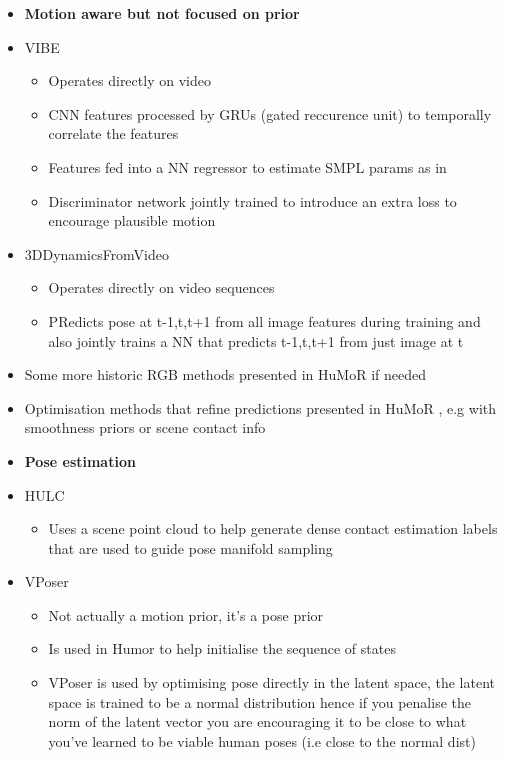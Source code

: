 \begin{itemize}
    \item \textbf{Motion aware but not focused on prior}
    \item VIBE
    \begin{itemize}
        \item Operates directly on video
        \item CNN features processed by GRUs (gated reccurence unit) to temporally correlate the features
        \item Features fed into a NN regressor to estimate SMPL params as in \cite{EndToEndPose}
        \item Discriminator network jointly trained to introduce an extra loss to encourage plausible motion
    \end{itemize}
    \item 3DDynamicsFromVideo \cite{3DDynamicsFromVideo}
    \begin{itemize}
        \item Operates directly on video sequences
        \item PRedicts pose at t-1,t,t+1 from all image features during training and also jointly trains a NN that predicts t-1,t,t+1 from just image at t
    \end{itemize}
    \item Some more historic RGB methods presented in HuMoR \cite{humor} if needed
    \item Optimisation methods that refine predictions presented in HuMoR \cite{humor}, e.g with smoothness priors or scene contact info

    \item \textbf{Pose estimation}
    \item HULC
    \begin{itemize}
        \item Uses a scene point cloud to help generate dense contact estimation labels that are used to guide pose manifold sampling 
    \end{itemize}
    \item VPoser
    \begin{itemize}
        \item Not actually a motion prior, it's a pose prior
        \item Is used in Humor to help initialise the sequence of states
        \item VPoser is used by optimising pose directly in the latent space, the latent space is trained to be a normal distribution hence if you penalise the norm of the latent vector you are encouraging it to be close to what you've learned to be viable human poses (i.e close to the normal dist)
    \end{itemize}


\end{itemize}
